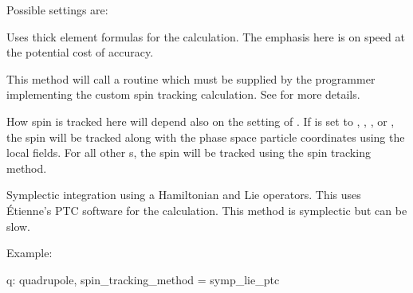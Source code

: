 Possible  settings are:
\begin{description}

\item[\vn{Bmad_Standard}] \Newline
Uses thick element formulas for the calculation. The emphasis here is on speed at the
potential cost of accuracy. 

\item[\vn{Custom}] \Newline
This method will call a routine  which must be
supplied by the programmer implementing the custom spin tracking
calculation. See  for more details.

\item[\vn{Tracking}] \Newline
How spin is tracked here will depend also on the setting of . If
 is set to , , , or
, the spin will be tracked along with the phase space particle
coordinates using the local fields. For all other s, the spin will be
tracked using the  spin tracking method.

\item[\vn{Symp_Lie_PTC}] \Newline
Symplectic integration using a Hamiltonian and Lie operators.  This uses \'Etienne's PTC
software for the calculation.  This method is symplectic but can be slow.

\end{description}

Example:
\begin{example}
  q: quadrupole, spin_tracking_method = symp_lie_ptc
\end{example}


